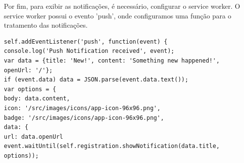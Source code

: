 Por fim, para exibir as notificações, é necessário, configurar o service worker. O service worker possui o evento 'push', onde configuramos uma função para o tratamento das notificações.
\begin{lstlisting}[frame=single,label=lst:notificacaoPersonalixada,caption= Notificação personalizada, basicstyle=\footnotesize]
self.addEventListener('push', function(event) {
console.log('Push Notification received', event);
var data = {title: 'New!', content: 'Something new happened!', openUrl: '/'};
if (event.data) data = JSON.parse(event.data.text());
var options = {
body: data.content,
icon: '/src/images/icons/app-icon-96x96.png',
badge: '/src/images/icons/app-icon-96x96.png',
data: {
url: data.openUrl
event.waitUntil(self.registration.showNotification(data.title, options));
\end{lstlisting}
\vspace{-0.62cm}
\begin{center}
\end{center}